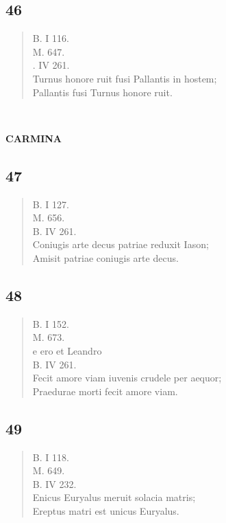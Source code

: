 \documentclass[11pt, a4paper]{report}
\begin{document}
            \subsection*{46}
      \begin{verse}
      B. I 116. \\ M. 647. \\ . IV 261. \\ Turnus honore ruit fusi Pallantis in hostem; \\ Pallantis fusi Turnus honore ruit. \\ 
      \end{verse}
  
            
        ﻿\pagebreak 
    
             \marginpar{[104]} 
            \begin{center} \textbf{CARMINA} \end{center}
            \subsection*{47}
      \begin{verse}
      B. I 127. \\ M. 656. \\ B. IV 261. \\ Coniugis arte decus patriae reduxit Iason; \\ Amisit patriae coniugis arte decus. \\ 
      \end{verse}
  
            \subsection*{48}
      \begin{verse}
      B. I 152. \\ M. 673. \\ e ero et Leandro \\ B. IV 261. \\ Fecit amore viam iuvenis crudele per aequor; \\ Praedurae morti fecit amore viam. \\ 
      \end{verse}
  
            \subsection*{49}
      \begin{verse}
      B. I 118. \\ M. 649. \\ B. IV 232. \\ Enicus Euryalus meruit solacia matris; \\ Ereptus matri est unicus Euryalus. \\ 
      \end{verse}
  
\end{document}
